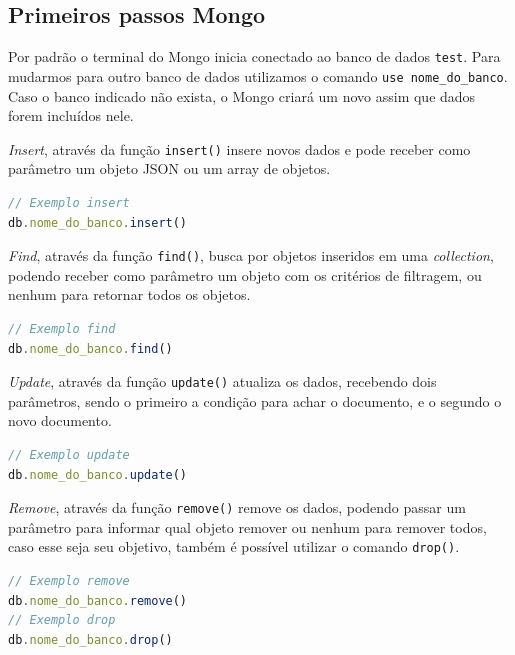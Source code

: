 \documentclass[
	12pt,				%
	openright,			%
	twoside,			%
	a4paper,			%
	english,			%
	brazil				%
	]{abntex2}
\begin{document}
\begin{anexosenv}

\partanexos

\chapter{Primeiros passos Mongo}

Por padrão o terminal do Mongo inicia conectado ao banco de dados \verb|test|. Para mudarmos para outro banco de dados utilizamos o comando \verb|use nome_do_banco|. Caso o banco indicado não exista, o Mongo criará um novo assim que dados forem incluídos nele.

\textit{Insert}, através da função \verb|insert()| insere novos dados e pode receber como parâmetro um objeto JSON ou um array de objetos.

\begin{lstlisting}[language=javascript]
// Exemplo insert
db.nome_do_banco.insert()
\end{lstlisting}

\textit{Find}, através da função \verb|find()|, busca por objetos inseridos em uma \textit{collection}, podendo receber como parâmetro um objeto com os critérios de filtragem, ou nenhum para retornar todos os objetos.
 
\begin{lstlisting}[language=javascript]
// Exemplo find
db.nome_do_banco.find()
\end{lstlisting}

\textit{Update}, através da função \verb|update()| atualiza os dados, recebendo dois parâmetros, sendo o primeiro a condição para achar o documento, e o segundo o novo documento.

\begin{lstlisting}[language=javascript]
// Exemplo update
db.nome_do_banco.update()
\end{lstlisting}

\textit{Remove}, através da função \verb|remove()| remove os dados, podendo passar um parâmetro para informar qual objeto remover ou nenhum para remover todos, caso esse seja seu objetivo, também é possível utilizar o comando \verb|drop()|.

\begin{lstlisting}[language=javascript]
// Exemplo remove
db.nome_do_banco.remove()
// Exemplo drop
db.nome_do_banco.drop()
\end{lstlisting}


\end{anexosenv}
\end{document}
